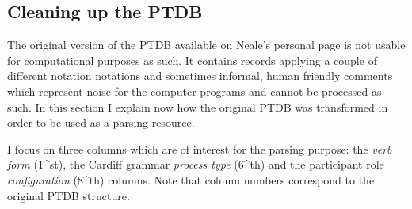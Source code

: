 \subsection{Cleaning up the PTDB}
The original version of the PTDB available on Neale's personal page is not usable for computational purposes as such. It  contains records applying a couple of different notation notations and sometimes informal, human friendly comments which represent noise for the computer programs and cannot be processed as such. In this section I explain now how the original PTDB was transformed in order to be used as a parsing resource.     

I focus on three columns which are of interest for the parsing purpose: the \textit{verb form} (1^{st}), the Cardiff grammar \textit{process type} (6^{th}) and the participant role \textit{configuration} (8^{th}) columns. Note that column numbers correspond to the original PTDB structure. 

